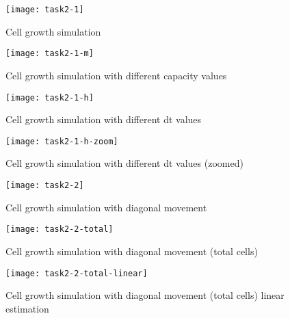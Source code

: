\begin{figure}[ht]
    \centering
    \texttt{[image: task2-1]}
    \caption[Cell growth simulation]{Cell growth simulation}
    \label{fig:task2-1}
\end{figure}

\begin{figure}[ht]
    \centering
    \texttt{[image: task2-1-m]}
    \caption[Cell growth simulation with different capacity values]{Cell growth simulation with different capacity values}
    \label{fig:task2-1-m}
\end{figure}

\clearpage

\begin{figure}[ht]
    \centering
    \texttt{[image: task2-1-h]}
    \caption[Cell growth simulation with different dt values]{Cell growth simulation with different dt values}
    \label{fig:task2-1-h}
\end{figure}

\begin{figure}[ht]
    \centering
    \texttt{[image: task2-1-h-zoom]}
    \caption[Cell growth simulation with different dt values (zoomed)]{Cell growth simulation with different dt values (zoomed)}
    \label{fig:task2-1-h-zoom}
\end{figure}

\clearpage

\begin{figure}[ht]
    \centering
    \texttt{[image: task2-2]}
    \caption[Cell growth simulation with diagonal movement]{Cell growth simulation with diagonal movement}
    \label{fig:task2-2}
\end{figure}

\begin{figure}[ht]
    \centering
    \texttt{[image: task2-2-total]}
    \caption[Cell growth simulation with diagonal movement (total cells)]{Cell growth simulation with diagonal movement (total cells)}
    \label{fig:task2-2-total}
\end{figure}

\begin{figure}[ht]
    \centering
    \texttt{[image: task2-2-total-linear]}
    \caption[Cell growth simulation with diagonal movement (total cells) linear estimation]{Cell growth simulation with diagonal movement (total cells) linear estimation}
    \label{fig:task2-2-total-linear}
\end{figure}
